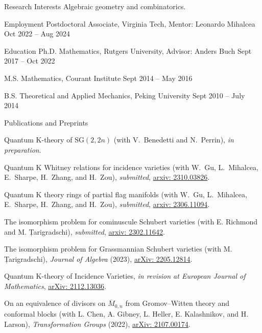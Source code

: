 \documentclass{resume} %
\begin{document}
\begin{rSection}{Research Interests}
    Algebraic geometry and combinatorics.
\end{rSection}

\begin{rSection}{Employment}
    {Postdoctoral Associate,} Virginia Tech, Mentor: Leonardo Mihalcea \hfill{Oct 2022 -- Aug 2024} 
\end{rSection}

\begin{rSection}{Education}
    {Ph.D. Mathematics,} Rutgers University, Advisor: Anders Buch \hfill{Sept 2017 -- Oct 2022}

    {M.S. Mathematics,} Courant Institute \hfill{Sept 2014 -- May 2016}

    {B.S. Theoretical and Applied Mechanics,} Peking University \hfill{Sept 2010 -- July 2014}
\end{rSection}

\begin{rSection}{Publications and Preprints}
    \begin{etaremune}
        \item Quantum K-theory of \(\mathrm{SG}(2,2n)\) (with V.~Benedetti and N.~Perrin), \emph{in preparation}.
        \item Quantum K Whitney relations for incidence varieties (with W.~Gu, L.~Mihalcea, E.~Sharpe, H.~Zhang, and H.~Zou), \emph{submitted}, \href{https://arxiv.org/abs/2310.03826}{arxiv: 2310.03826}.
        \item Quantum K theory rings of partial
        flag manifolds (with W.~Gu, L.~Mihalcea, E.~Sharpe, H.~Zhang, and H.~Zou), \emph{submitted}, \href{https://arxiv.org/abs/2306.11094}{arxiv: 2306.11094}.
        \item The isomorphism problem for cominuscule Schubert varieties (with E. Richmond and M. Țarigradschi), \emph{submitted}, \href{https://arxiv.org/abs/2302.11642}{arxiv: 2302.11642}.
        \item The isomorphism problem for Grassmannian Schubert varieties (with M. Țarigradschi), \emph{Journal of Algebra} (2023), \href{https://arxiv.org/abs/2205.12814}{arXiv: 2205.12814}.
        \item Quantum K-theory of Incidence Varieties, \emph{in revision at European Journal of Mathematics}, \href{https://arxiv.org/abs/2112.13036}{arXiv: 2112.13036}.
        \item On an equivalence of divisors on $\overline{M}_{0, n}$ from Gromov--Witten theory and conformal blocks (with L. Chen, A. Gibney, L. Heller, E. Kalashnikov, and H. Larson), \emph{Transformation Groups} (2022), \href{https://arxiv.org/abs/2107.00174}{arXiv: 2107.00174}.
    \end{etaremune}
\end{rSection}
\end{document}

